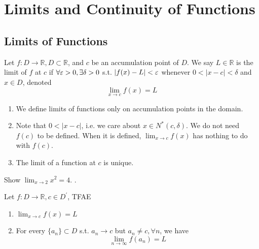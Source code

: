 
\newpage

\section{Limits and Continuity of Functions}

\subsection{Limits of Functions}

\begin{definition}
    Let $f: D \to \mathbb{R}, D \subset \mathbb{R}$,  and $c$
    be an accumulation point of $D$. We say $L \in \mathbb{R}$
    is the limit of $f$ at $c$ if $\forall \varepsilon > 0, \exists \delta > 0$
    s.t. $|f(x) - L | < \varepsilon$ whenever $0 < |x - c| < \delta$ and 
    $x \in D$,
    denoted 
    \[
        \lim_{x \to c} f(x) = L
    \]
    
\end{definition}

\begin{remark}
    \hfill
    \begin{enumerate}
        \item We define limits of functions only on accumulation points
        in the domain. 
        \item Note that $0 < |x - c|$, i.e. we care about $x \in N^*(c, \delta)$.
        We do not need $f(c)$ to be defined. 
        When it is defined, $\lim_{x \to c}f(x)$ has nothing to do with
        $f(c)$.
        \item The limit of a function at $c$ is unique.
    \end{enumerate}
\end{remark}

\begin{example}
    Show $\lim_{x \to 2}x^2 = 4$.
    .
\end{example}


\begin{theorem}
    \hfill

    Let $f: D \to \mathbb{R}, c \in D^{\prime}$, TFAE
    \begin{enumerate}
        \item $\lim_{x \to c}f(x)= L$
        \item For every $ \{ a_n \} \subset D$ s.t. $a_n \to c$ but 
        $a_n \neq c, \forall n$, we have 
    \[
        \lim_{n \to \infty} f(a_n) = L
    \]
    \end{enumerate}
\end{theorem}

